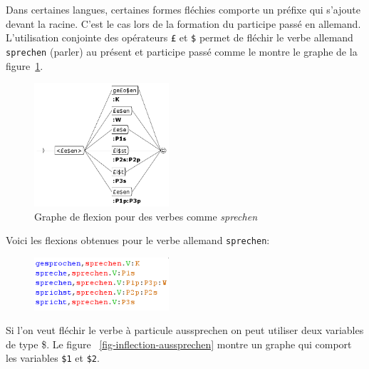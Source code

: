 \noindent Dans certaines langues, certaines formes fléchies comporte un préfixe qui s'ajoute devant la racine.
C'est le cas lors de la formation du participe passé en allemand. L'utilisation conjointe des
opérateurs \verb+£+ et \verb+$+ permet de fléchir le verbe allemand \verb+sprechen+ (parler)
au présent et participe passé comme le montre le graphe de la figure~\ref{fig-inflection-sprechen}.

\newpage
\begin{figure}[!htbp]
\begin{center}
\includegraphics[width=5cm]{resources/img/fig3-Advanced_operators_with_Variables-V_sprechen.png}
\caption{Graphe de flexion pour des verbes comme {\it sprechen}
\label{fig-inflection-sprechen}}
\end{center}
\end{figure}

\noindent Voici les flexions obtenues pour le verbe allemand \verb+sprechen+:

\bigskip
\begin{figure}[!ht]
\begin{center}
\includegraphics[width=5cm]{resources/img/fig3-flexion_sprechen.png}
\end{center}
\end{figure}

\noindent Si l'on veut fléchir le verbe à particule aussprechen on peut utiliser deux variables de type \$.
Le figure ~\ref{fig-inflection-aussprechen} montre un graphe qui comport les variables \verb+$1+ et \verb+$2+.

